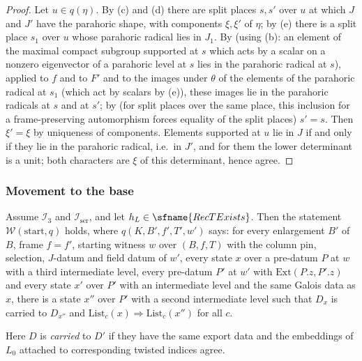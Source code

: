 \begin{proof}
Let $u\in q(\eta)$. By (c) and (d) there are split places $s,s'$ over $u$ at which $J$ and $J'$ have the parahoric
shape, with components $\xi,\xi'$ of $\eta$; by (e) there is a split place $s_1$ over $u$ whose parahoric radical
lies in $J_1$. By  (using (b): an element of the maximal compact
subgroup supported at $s$ which acts by a scalar on a nonzero eigenvector of a parahoric level at $s$ lies in the
parahoric radical at $s$), applied to $f$ and to $F'$ and to the images under $\theta$ of the elements of the
parahoric radical at $s_1$ (which act by scalars by (e)), these images lie in the parahoric radicals at $s$ and at
$s'$; by  (for split places over the same
place, this inclusion for a frame-preserving automorphism forces equality of the split places) $s'=s$. Then
$\xi'=\xi$ by uniqueness of components. Elements supported at $u$ lie in $J$ if and only if they lie in the parahoric radical,
i.e.\ in $J'$, and for them the lower determinant is a unit; both characters are $\xi$ of this determinant,
hence agree.
\end{proof}

\subsubsection{Movement to the base}

\begin{lemma}\label{pf:baselat2:tob1}
Assume $\mathcal I_3$ and $\mathcal I_{\mathrm{ser}}$, and let $h_L\in\sfname{RecTExists}$. Then the statement
$\mathcal{W}(\mathrm{start},q)$ holds, where $q(K,B',f',T',w')$ says: for every enlargement $B'$ of $B$, frame $f=f'$,
starting witness $w$ over $(B,f,T)$ with the column pin, selection, $J$-datum and field datum of $w'$, every
state $x$ over a pre-datum $P$ at $w$ with a third intermediate level, every pre-datum $P'$ at $w'$ with
$\mathrm{Ext}(P.z,P'.z)$ and every state $x'$ over $P'$ with an intermediate level and the same Galois data as $x$,
there is a state $x''$ over $P'$ with a second intermediate level such that $D_x$ is carried to $D_{x''}$ and
$\mathrm{List}_c(x)\Rightarrow\mathrm{List}_c(x'')$ for all $c$.
\end{lemma}

Here $D$ is \emph{carried} to $D'$ if they have the same export data and the embeddings of $L_0$ attached to
corresponding twisted indices agree.

